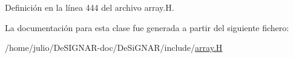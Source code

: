 Definición en la línea 444 del archivo array.\+H.



La documentación para esta clase fue generada a partir del siguiente fichero\+:\begin{DoxyCompactItemize}
\item 
/home/julio/\+De\+S\+I\+G\+N\+A\+R-\/doc/\+De\+Si\+G\+N\+A\+R/include/\hyperlink{array_8_h}{array.\+H}\end{DoxyCompactItemize}
